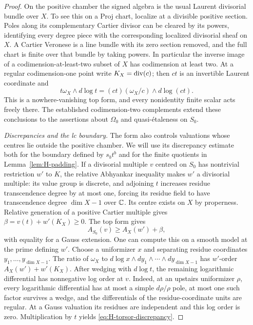 \begin{proof}
On the positive chamber the signed algebra is the usual Laurent
divisorial bundle over $X$.  To see this on a Proj chart, localize at a
divisible positive section.  Poles along its complementary Cartier
divisor can be cleared by its powers, identifying every degree piece
with the corresponding localized divisorial sheaf on $X$.  A Cartier
Veronese is a line bundle with its zero section removed, and the full
chart is finite over that bundle by taking powers.  In particular the
inverse image of a codimension-at-least-two subset of $X$ has codimension
at least two.  At a regular codimension-one point write
$K_X=\operatorname{div}(c)$; then $ct$ is an invertible Laurent coordinate and
\[
 t\omega_X\wedge d\log t
   =(ct)(\omega_X/c)\wedge d\log(ct).
\]
This is a nowhere-vanishing top form, and every nonidentity finite
scalar acts freely there.  The established codimension-two complements
extend these conclusions to the assertions about $\Omega_0$ and
quasi-\'{e}taleness on $S_0$.

\medskip
\noindent\textit{Discrepancies and the lc boundary.}
The form also controls valuations whose centres lie outside the positive
chamber.  We will use its discrepancy estimate both for the boundary
defined by $s_bt^b$ and for the finite quotients in
Lemma~\ref{lem:H-padding}.  If a divisorial multiple $v$ centred on $S_0$ has
nontrivial restriction $w'$ to $K$, the relative Abhyankar inequality
makes $w'$ a divisorial multiple: its value group is discrete, and
adjoining $t$ increases residue transcendence degree by at most one,
forcing its residue field to have transcendence degree $\dim X-1$ over
$\mathbb C$.
Its centre exists on $X$ by properness.
Relative generation of a positive Cartier multiple gives
$\beta=v(t)+w'(K_X)\ge0$.  The top form gives
\begin{equation}\label{eq:H-torsor-discrepancy}
 A_{S_0}(v)\ge A_X(w')+\beta,
\end{equation}
with equality for a Gauss extension.  One can compute this on a smooth
model at the prime defining $w'$.  Choose a uniformizer $x$ and
separating residue coordinates $y_1,\ldots,y_{\dim X-1}$.  The ratio of
$\omega_X$ to $d\log x\wedge dy_1\wedge\cdots\wedge dy_{\dim X-1}$
has $w'$-order $A_X(w')+w'(K_X)$.  After wedging with $d\log t$, the remaining
logarithmic differential has nonnegative log order at $v$.  Indeed, at
an upstairs uniformizer $\rho$, every logarithmic differential has at
most a simple $d\rho/\rho$ pole, at most one such factor survives a
wedge, and the differentials of the residue-coordinate units are
regular.  At a Gauss
valuation its residues are independent and this log order is zero.
Multiplication by $t$ yields \eqref{eq:H-torsor-discrepancy}.


\end{proof}
